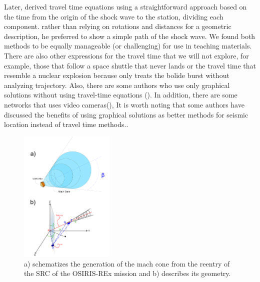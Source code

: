 \documentclass[linenum]{SSA-SRL}
\begin{document}
Later, \cite{Pujol_2005} derived travel time equations using a straightforward approach based on the time from the origin of the shock wave to the station, dividing each component. \cite{Pujol_2005} rather than relying on rotations and distances for a geometric description, he preferred to show a simple path of the shock wave. We found both methods to be equally manageable (or challenging) for use in teaching materials.
There are also other expressions for the travel time that we will not explore, for example, those that follow a space shuttle that never lands \citep{Kanamori1992} or the travel time that resemble a nuclear explosion because only treats the bolide burst without analyzing trajectory. Also, there are some authors who use only graphical solutions without using travel-time equations (\citealp{Kalenda_2013, Brown_1996}). In addition, there are some networks that uses video cameras(\citealp{Ishihara_2004,Kereszturi_2021,Borovi_KA_2003}), It is worth noting that some authors have discussed the benefits of using graphical solutions as better methods for seismic location instead of travel time methods.\citep{https://doi.org/10.1029/2002GL014722}. 
\vspace{0.5cm} %
\begin{figure} %
    \centering
    \includegraphics[width=0.4\textwidth]{PUJOL GENERAL2.pdf}
    \caption{a) schematizes the generation of the mach cone from the reentry of the SRC of the OSIRIS-REx mission and b) describes its geometry.}
    \label{fig:cono_osiris} %
\end{figure}
\vspace{0.2cm} %
\end{document}
